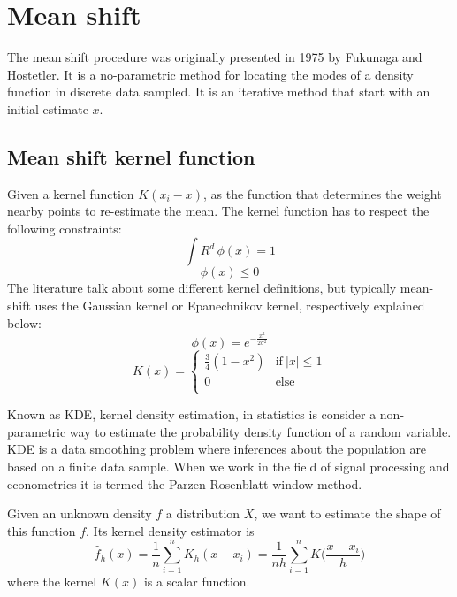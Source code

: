 \chapter{Mean shift}
The mean shift procedure was originally presented in 1975 by Fukunaga and Hostetler. It is a no-parametric method for locating the modes of a density function in  discrete data sampled. It is an iterative method that start with an initial estimate $x$.
\section{Mean shift kernel function}
Given a kernel function $K(x_{i}-x)$, as the function that determines the weight nearby points to re-estimate the mean. The kernel function has to respect the following constraints:
\begin{equation}
\int R^{d} \,\phi({x})=1 
\end{equation}
\begin{equation}
\phi ({x}) \leq 0
\end{equation}
The literature talk about some different kernel definitions, but typically mean-shift uses the Gaussian kernel or Epanechnikov kernel, respectively explained below:
\begin{equation}
\phi({x}) = e^{-\frac{x^{2}}{2\sigma^{2}}}
\end{equation}
\begin{equation}
K(x)={\begin{cases}\frac{3}{4}(1-x^{2})&{\text{if}}\ |x|\leq 1 \\0&{\text{else}}\  \\\end{cases}}
\end{equation}

\bigskip

Known as KDE, kernel density estimation, in statistics is consider a non-parametric way to estimate the probability density function of a random variable. KDE is a data smoothing problem where inferences about the population are based on a finite data sample. When we work in the field of signal processing and econometrics it is termed the Parzen-Rosenblatt window method. 

\bigskip

Given an unknown density $f$ a distribution $X$, we want to estimate the shape of this function $f$. Its kernel density estimator is 
\begin{equation}
{{\hat {f}}_{h}(x)={\frac {1}{n}}\sum _{i=1}^{n}K_{h}(x-x_{i})={\frac {1}{nh}}\sum _{i=1}^{n}K{\Big (}{\frac {x-x_{i}}{h}}{\Big )}}
\end{equation} 
where the kernel $K(x)$ is a scalar function.

